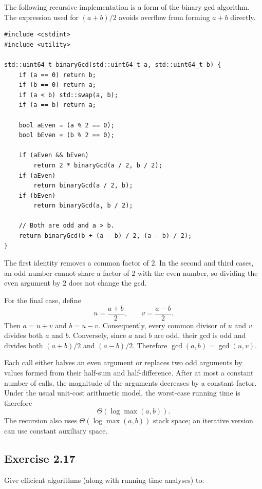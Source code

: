 \documentclass[12pt,a4paper]{article}
\begin{document}
The following recursive implementation is a form of the binary gcd
algorithm. The expression used for $(a+b)/2$ avoids overflow from
forming $a+b$ directly.

\begin{lstlisting}
#include <cstdint>
#include <utility>

std::uint64_t binaryGcd(std::uint64_t a, std::uint64_t b) {
    if (a == 0) return b;
    if (b == 0) return a;
    if (a < b) std::swap(a, b);
    if (a == b) return a;

    bool aEven = (a % 2 == 0);
    bool bEven = (b % 2 == 0);

    if (aEven && bEven)
        return 2 * binaryGcd(a / 2, b / 2);
    if (aEven)
        return binaryGcd(a / 2, b);
    if (bEven)
        return binaryGcd(a, b / 2);

    // Both are odd and a > b.
    return binaryGcd(b + (a - b) / 2, (a - b) / 2);
}
\end{lstlisting}

The first identity removes a common factor of $2$. In the second and
third cases, an odd number cannot share a factor of $2$ with the even
number, so dividing the even argument by $2$ does not change the gcd.

For the final case, define
\[
u=\frac{a+b}{2},\qquad v=\frac{a-b}{2}.
\]
Then $a=u+v$ and $b=u-v$. Consequently, every common divisor of $u$
and $v$ divides both $a$ and $b$. Conversely, since $a$ and $b$ are
odd, their gcd is odd and divides both $(a+b)/2$ and $(a-b)/2$.
Therefore $\gcd(a,b)=\gcd(u,v)$.

Each call either halves an even argument or replaces two odd arguments
by values formed from their half-sum and half-difference. After at most
a constant number of calls, the magnitude of the arguments decreases
by a constant factor. Under the usual unit-cost arithmetic model, the
worst-case running time is therefore
\[
\boxed{\Theta(\log \max(a,b))}.
\]
The recursion also uses $\Theta(\log \max(a,b))$ stack space; an
iterative version can use constant auxiliary space.

\subsection*{\color{sectionnavy}Exercise 2.17}

\noindent
Give efficient algorithms (along with running-time analyses) to:
\end{document}

